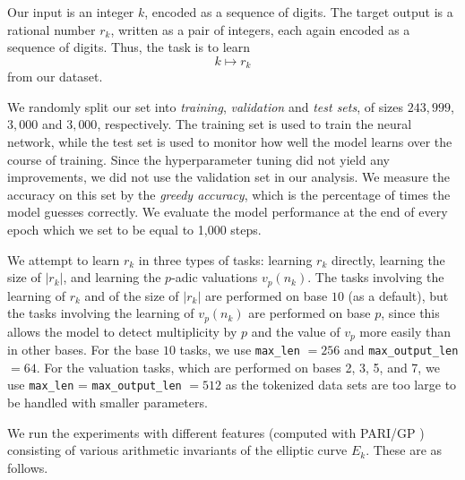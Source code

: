 \documentclass[12pt]{amsart}%
\newcommand{\1}{\mathds{1}}
\theoremstyle{definition}
\numberwithin{equation}{section}
\numberwithin{table}{section}
\numberwithin{figure}{section}
\begin{document}
Our input is an integer $k$, encoded as a sequence of digits. The target output is a rational number $r_k$, written as a pair of integers, each again encoded as a sequence of digits. Thus, the task is to learn
\[
k \mapsto r_k
\]
from our dataset.

We randomly split our set into \emph{training}, \emph{validation} and \emph{test sets},  of sizes $243{,}999$, $3{,}000$ and $3{,}000$, respectively. The training set is used to train the neural network, while the test set is used to monitor how well the model learns over the course of training. Since the hyperparameter tuning did not yield any improvements, we did not use the validation set in our analysis. We measure the accuracy on this set by the \emph{greedy accuracy}, which is the percentage of times the model guesses correctly. We evaluate the model performance at the end of every epoch which we set to be equal to 1,000 steps.

We attempt to learn $r_k$ in three types of tasks: learning $r_k$ directly, learning the size of $|r_k|$, and learning the $p$-adic valuations $v_p(n_k)$. The tasks involving the learning of $r_k$ and of the size of $|r_k|$ are performed on base $10$ (as a default), but the tasks involving the learning of $v_p(n_k)$ are performed on base $p$, since this allows the model to detect multiplicity by $p$ and the value of $v_p$ more easily than in other bases. For the base $10$ tasks, we use \texttt{max\_len} $=256$ and \texttt{max\_output\_len} $=64$. For the valuation tasks, which are performed on bases 2, 3, 5, and 7, we use \texttt{max\_len} = \texttt{max\_output\_len} $=512$ as the tokenized data sets are too large to be handled with smaller parameters.


We run the experiments with different features (computed with \textsc{PARI/GP} \cite{PARI}) consisting of various arithmetic invariants of the elliptic curve $E_k$. These are as follows.
\end{document}
